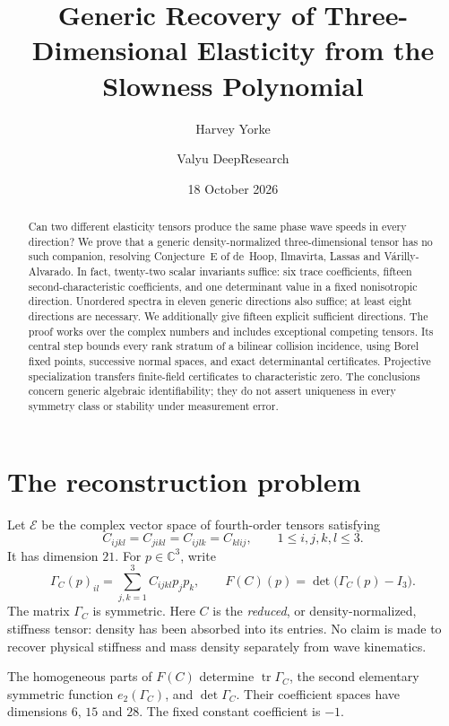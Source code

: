 \documentclass[11pt]{amsart}
\title[Generic elastic reconstruction]{Generic Recovery of Three-Dimensional Elasticity from the Slowness Polynomial}
\author{Harvey Yorke}
\author{Valyu DeepResearch}
\date{18 October 2026}
\theoremstyle{remark}
\newcommand{\C}{\mathbb C}
\newcommand{\E}{\mathcal E}
\newcommand{\tr}{\operatorname{tr}}
\begin{document}
\begin{abstract}
Can two different elasticity tensors produce the same phase wave speeds in every direction? We prove that a generic density-normalized three-dimensional tensor has no such companion, resolving Conjecture~E of de~Hoop, Ilmavirta, Lassas and V\'arilly-Alvarado. In fact, twenty-two scalar invariants suffice: six trace coefficients, fifteen second-characteristic coefficients, and one determinant value in a fixed nonisotropic direction. Unordered spectra in eleven generic directions also suffice; at least eight directions are necessary. We additionally give fifteen explicit sufficient directions. The proof works over the complex numbers and includes exceptional competing tensors. Its central step bounds every rank stratum of a bilinear collision incidence, using Borel fixed points, successive normal spaces, and exact determinantal certificates. Projective specialization transfers finite-field certificates to characteristic zero. The conclusions concern generic algebraic identifiability; they do not assert uniqueness in every symmetry class or stability under measurement error.
\end{abstract}
\maketitle

\section{The reconstruction problem}

Let $\E$ be the complex vector space of fourth-order tensors satisfying
\begin{equation}\label{eq:symmetry}
 C_{ijkl}=C_{jikl}=C_{ijlk}=C_{klij},\qquad 1\leq i,j,k,l\leq3.
\end{equation}
It has dimension $21$. For $p\in\C^3$, write
\begin{equation}\label{eq:christoffel}
 \Gamma_C(p)_{il}=\sum_{j,k=1}^3 C_{ijkl}p_jp_k,
 \qquad F(C)(p)=\det\bigl(\Gamma_C(p)-I_3\bigr).
\end{equation}
The matrix $\Gamma_C$ is symmetric. Here $C$ is the \emph{reduced}, or density-normalized, stiffness tensor: density has been absorbed into its entries. No claim is made to recover physical stiffness and mass density separately from wave kinematics.

The homogeneous parts of $F(C)$ determine $\tr\Gamma_C$, the second elementary symmetric function $e_2(\Gamma_C)$, and $\det\Gamma_C$. Their coefficient spaces have dimensions $6$, $15$ and $28$. The fixed constant coefficient is $-1$.
\end{document}
